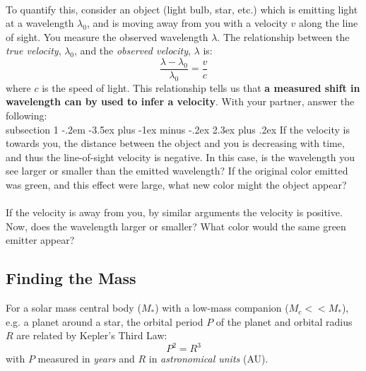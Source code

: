 \documentclass[12pt]{article}
\makeatletter
\newenvironment{problem}{\@startsection
       {subsection}
       {1}
       {-.2em}
       {-3.5ex plus -1ex minus -.2ex}
       {2.3ex plus .2ex}
       {\pagebreak[3]%
       \normalsize\bf\noindent{Problem }
       }
       }
       {%
       }
\makeatother
\begin{document}
\paragraph{}
To quantify this, consider an object (light bulb, star, etc.) which is emitting light at a wavelength $\lambda_0$, and is
moving away from you with a velocity $v$ along the line of sight. You measure the observed wavelength $\lambda$. The
relationship between the \textit{true velocity}, $\lambda_0$, and the \textit{observed velocity}, $\lambda$ is:
\begin{equation}
\frac{\lambda - \lambda_0}{\lambda_0} = \frac{v}{c}
\end{equation}
where $c$ is the speed of light. This relationship tells us that \textbf{a measured shift in wavelength can by used to infer a velocity}. With your partner, answer
the following:\\
\vspace{10 pt}
\begin{problem}{ }
	If the velocity is towards you, the distance between the object and you is 
	decreasing with time, and thus the line-of-sight velocity is negative. In this case, is the wavelength
	you see larger or smaller than the emitted wavelength? If the original color emitted
	was green, and this effect were large, what new color might the object appear?
	\\ \\
	If the velocity is away from you, by similar arguments the velocity is positive. Now,
	does the wavelength larger or smaller? What color would the same green emitter appear?
\end{problem}


\subsection{Finding the Mass}

For a solar mass central body ($M_*$) with a low-mass companion ($M_c << M_*$), e.g. a planet around a star, the orbital period $P$ of the planet and orbital
radius $R$ are related by Kepler's Third Law:
\begin{equation}
P^2 = R^3
\end{equation}
with $P$ measured in \textit{years} and $R$ in \textit{astronomical units} (AU).
\end{document}
